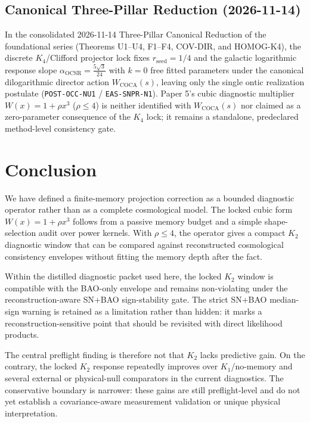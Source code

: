 \documentclass[11pt]{article}
\begin{document}
\subsection{Canonical Three-Pillar Reduction (2026-11-14)}
In the consolidated 2026-11-14 Three-Pillar Canonical Reduction of the
foundational series (Theorems U1--U4, F1--F4, COV-DIR, and HOMOG-K4), the
discrete $K_4$/Clifford projector lock fixes $r_{\mathrm{seed}}=1/4$ and the
galactic logarithmic response slope $\alpha_{\mathrm{OCSR}}=\frac{5\sqrt{3}}{24}$
with $k=0$ free fitted parameters under the canonical dilogarithmic director
action $W_{\mathrm{COCA}}(s)$, leaving only the single ontic realization
postulate (\texttt{POST-OCC-NU1} / \texttt{EAS-SNPR-N1}). Paper 5's cubic
diagnostic multiplier $W(x)=1+\rho x^3$ ($\rho\leq 4$) is neither identified
with $W_{\mathrm{COCA}}(s)$ nor claimed as a zero-parameter consequence of the
$K_4$ lock; it remains a standalone, predeclared method-level consistency gate.

\section{Conclusion}

We have defined a finite-memory projection correction as a bounded diagnostic
operator rather than as a complete cosmological model. The locked cubic form
$W(x)=1+\rho x^3$ follows from a passive memory budget and a simple
shape-selection audit over power kernels. With $\rho \leq 4$, the operator gives
a compact $K_2$ diagnostic window that can be compared against reconstructed
cosmological consistency envelopes without fitting the memory depth after the
fact.

Within the distilled diagnostic packet used here, the locked $K_2$ window is
compatible with the BAO-only envelope and remains non-violating under the
reconstruction-aware SN+BAO sign-stability gate. The strict SN+BAO median-sign
warning is retained as a limitation rather than hidden: it marks a
reconstruction-sensitive point that should be revisited with direct likelihood
products.

The central preflight finding is therefore not that $K_2$ lacks predictive gain.
On the contrary, the locked $K_2$ response repeatedly improves over $K_1$/no-memory
and several external or physical-null comparators in the current diagnostics.
The conservative boundary is narrower: these gains are still preflight-level
and do not yet establish a covariance-aware measurement validation or unique
physical interpretation.
\end{document}
